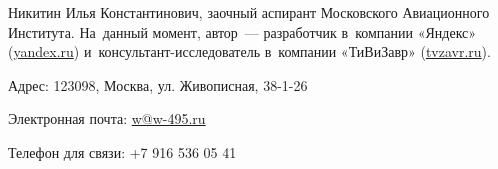 

Никитин Илья Константинович, заочный аспирант Московского Авиационного Института.
На~данный момент, автор~— разработчик в~компании «Яндекс» (\href{http://yandex.ru}{yandex.ru})
и~консультант-исследователь в~компании «ТиВиЗавр» (\href{http://tvzavr.ru}{tvzavr.ru}).

Адрес: 123098, Москва, ул. Живописная, 38-1-26

Электронная почта: \href{mailto:w@w-495.ru}{w@w-495.ru}

Телефон для связи: +7 916 536 05 41
